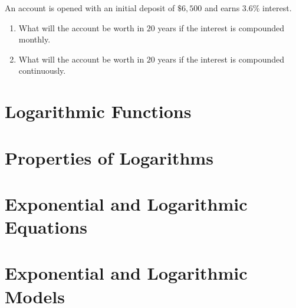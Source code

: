 \begin{exercise}
  An account is opened with an initial deposit of $\$6,500$ and earns $3.6\%$ interest.
  
  \begin{enumerate}
    \item What will the account be worth in $20$ years if the interest is compounded monthly. 
    \item What will the account be worth in $20$ years if the interest is compounded continuously. 
  \end{enumerate}
\end{exercise}


\newpage
\section{Logarithmic Functions}

\newpage
\section{Properties of Logarithms}

\newpage
\section{Exponential and Logarithmic Equations}

\newpage
\section{Exponential and Logarithmic Models}









